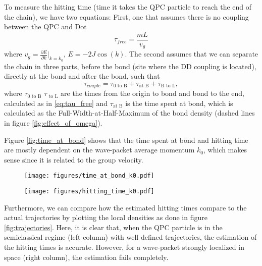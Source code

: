 \documentclass{article}
\begin{document}
To measure the hitting time (time it takes the QPC particle to reach the end of the chain), we have two equations: First, one that assumes there is no coupling between the QPC and Dot
\begin{equation}\label{eq:tau_free}
    \tau_{free} = \frac{m L}{v_{g}}
\end{equation}
where $v_{g}=\frac{\partial E}{\partial k}\vert_{k=k_{0}}, \, E=-2J\cos(k)$. The second assumes that we can separate the chain in three parts, before the bond (site where the DD coupling is located), directly at the bond and after the bond, such that
\begin{equation}\label{eq:tau_couple}
    \tau_{couple} = \tau_{\text{0 to B}}+\tau_{\text{at B}} + \tau_{\text{B to L}},
\end{equation}
where $\tau_{\text{0 to B}}$ $\tau_{\text{ to L}}$ are the times from the origin to bond and bond to the end, calculated as in \eqref{eq:tau_free} and $\tau_{\text{at B}}$ is the time spent at bond, which is calculated as the Full-Width-at-Half-Maximum of the bond density (dashed lines in figure \ref{fig:effect_of_omega}).

Figure \ref{fig:time_at_bond} shows that the time spent at bond and hitting time are mostly dependent on the wave-packet average momentum $k_0$, which makes sense since it is related to the group velocity.

\begin{figure*}[t!]
    \centering
    \begin{subfigure}[t]{0.4\textwidth}
        \centering
        \texttt{[image: figures/time\_at\_bond\_k0.pdf]}
        \caption{}
    \end{subfigure}%
    
    \begin{subfigure}[t]{0.75\textwidth}
        \centering
        \texttt{[image: figures/hitting\_time\_k0.pdf]}
        \caption{}
    \end{subfigure}\caption{Effect of the average wave-packet momentum $k_0$. (a) Time spent at bond (b) Time it takes the QPC to reach then end of the chain (Hitting time). The left plot for $\tau_{coupled}$ shows the hitting time estimation including the interaction at the bond (eq. \eqref{eq:tau_couple}) and the right one for $\tau_{free}$ is the time without the bond interaction (eq.\eqref{eq:tau_free})}\label{fig:time_at_bond}
\end{figure*}

Furthermore, we can compare how the estimated hitting times compare to the actual trajectories by plotting the local densities as done in figure \ref{fig:trajectories}. Here, it is clear that, when the QPC particle is in the semiclassical regime (left column) with well defined trajectories, the estimation of the hitting times is accurate. However, for a wave-packet strongly localized in space (right column), the estimation fails completely. 
\end{document}
